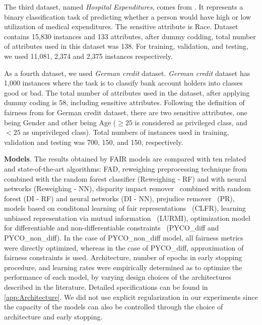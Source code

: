 \documentclass[preprint,12pt]{elsarticle}
\begin{document}
The third dataset, named \textit{Hospital Expenditures}, comes from \cite{bellamy2019ai}. It represents a binary classification task of predicting whether a person would have high or low utilization of medical expenditures. The sensitive attribute is Race. Dataset contains 15,830 instances and 133 attributes, after dummy codding, total number of attributes used in this dataset was 138. For training, validation, and testing, we used 11,081, 2,374 and 2,375 instances respectively.

As a fourth dataset, we used \textit{German credit} dataset. \textit{German credit} dataset has 1,000 instances where the task is to classify bank account holders into classes good or bad. The total number of attributes used in the dataset, after applying dummy coding is 58, including sensitive attributes. Following the definition of fairness from \cite{kamiran2012decision} for German credit dataset, there are two sensitive attributes, one being Gender and other being Age ($\geq 25$ is considered as privileged class, and $< 25$ as unprivileged class).  Total numbers of instances used in training, validation and testing was 700, 150, and 150, respectively.

\textbf{Models}. \sloppy The results obtained by FAIR models are compared with ten related and state-of-the-art algorithms: FAD, reweighing preprocessing technique from~\cite{kamiran2012data} combined with the random forest classifier (Reweighing - RF) and with neural networks (Reweighing - NN), disparity impact remover~\cite{feldman2015certifying} combined with random forest (DI - RF) and neural networks (DI - NN), prejudice remover~\cite{kamishima2012fairness} (PR), models based on conditonal learning of fair representations~\cite{zhao2019conditional} (CLFR), learning unbiased representation via mutual information~\cite{ragonesi2021learning} (LURMI), optimization model for differentiable and non-differentiable constraints~\cite{cotter2019optimization} (PYCO\_diff and PYCO\_non\_diff). In the case of PYCO\_non\_diff model, all fairness metrics were directly optimized, whereas in the case of PYCO\_diff, approximation of fairness constraints is used. Architecture, number of epochs in early stopping procedure, and learning rates were empirically determined as to optimize the performance of each model, by varying design choices of the architectures described in the literature. Detailed specifications can be found in \ref{app:Architecture}. We did not use explicit regularization in our experiments since the capacity of the models can also be controlled through the choice of architecture and early stopping.
\end{document}
